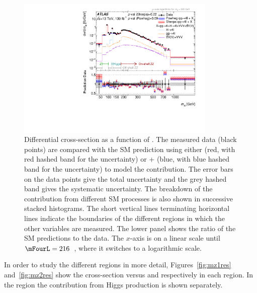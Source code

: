 \begin{figure}[tb]
  \centering
  \includegraphics[width = 0.85\textwidth]{figures/m4l/UnfoldedResults/linlog_Unfolded_Data_inclm4l.pdf}
\caption{Differential cross-section as a function of \mFourL. The measured data
  (black points)  are compared with the SM
  prediction using either \SHERPA{} (red, with red hashed
  band for the uncertainty) or \POWHEG{} + \pythia{} (blue,
  with blue hashed band for the uncertainty) to model the \qqFourL{} contribution. The error bars on the data points give the total uncertainty
  and the grey hashed band gives the systematic uncertainty. The
  breakdown of the contribution from different SM processes is also
  shown in successive stacked histograms.
  The short vertical lines terminating horizontal lines indicate the boundaries of the different
  \mFourL{} regions in which the other variables are measured.
  \Pvalue{}
  The
  lower panel shows the ratio of the SM predictions to the 
  data. The $x$-axis is on a linear scale until $\mFourL = 216$~\GeV,
  where it switches to a logarithmic scale. \label{fig:cross-sec-m4l}}
 \end{figure}
 In order to study the different \mFourL{} regions in more detail,  Figures~\ref{fig:mz1res} and~\ref{fig:mz2res} 
 show the cross-section versus 
 \mZOne{} and \mZTwo{} respectively in each region.
In the \HFourL{} region the contribution from Higgs production is
shown separately.
